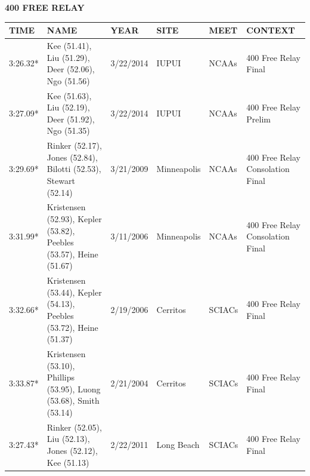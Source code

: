 \begin{table}[H]
\centering
\begin{minipage}[t]{0.6\textwidth}
\centering
\textbf{400 FREE RELAY}\\[0.1cm]
\begin{tabular}{@{}p{1.8cm}p{2.8cm}p{1.2cm}p{1.4cm}p{1.4cm}p{2.0cm}@{}}
\hline
    \textbf{TIME} & \textbf{NAME} & \textbf{YEAR} & \textbf{SITE} & \textbf{MEET} & \textbf{CONTEXT} \\
\hline
    3:26.32* & Kee (51.41), Liu (51.29), Deer (52.06), Ngo (51.56) & 3/22/2014 & IUPUI & NCAAs & 400 Free Relay Final \\
    3:27.09* & Kee (51.63), Liu (52.19), Deer (51.92), Ngo (51.35) & 3/22/2014 & IUPUI & NCAAs & 400 Free Relay Prelim \\
    3:29.69* & Rinker (52.17), Jones (52.84), Bilotti (52.53), Stewart (52.14) & 3/21/2009 & Minneapolis & NCAAs & 400 Free Relay Consolation Final \\
    3:31.99* & Kristensen (52.93), Kepler (53.82), Peebles (53.57), Heine (51.67) & 3/11/2006 & Minneapolis & NCAAs & 400 Free Relay Consolation Final \\
    3:32.66* & Kristensen (53.44), Kepler (54.13), Peebles (53.72), Heine (51.37) & 2/19/2006 & Cerritos & SCIACs & 400 Free Relay Final \\
    3:33.87* & Kristensen (53.10), Phillips (53.95), Luong (53.68), Smith (53.14) & 2/21/2004 & Cerritos & SCIACs & 400 Free Relay Final \\
    3:27.43* & Rinker (52.05), Liu (52.13), Jones (52.12), Kee (51.13) & 2/22/2011 & Long Beach & SCIACs & 400 Free Relay Final \\
\hline
\end{tabular}
\end{minipage}
\end{table}


